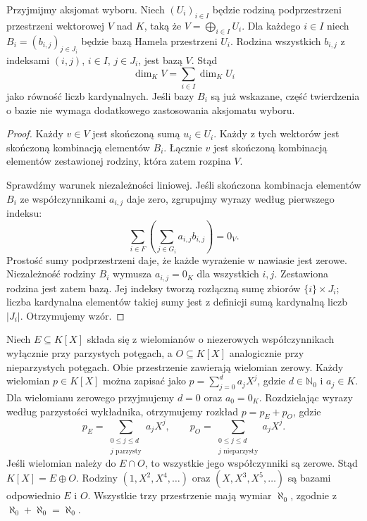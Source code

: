 \begin{twierdzenie}
\label{thm:lin2-wymiar-sumy-prostej}
Przyjmijmy aksjomat wyboru.
Niech \((U_i)_{i\in I}\) będzie rodziną
podprzestrzeni przestrzeni wektorowej \(V\) nad \(K\),
taką że \(V=\bigoplus_{i\in I}U_i\).
Dla każdego \(i\in I\) niech
\(B_i=(b_{i,j})_{j\in J_i}\)
będzie bazą Hamela przestrzeni \(U_i\).
Rodzina wszystkich \(b_{i,j}\)
z indeksami \((i,j)\), \(i\in I\), \(j\in J_i\),
jest bazą \(V\). Stąd
\[
 \dim_KV=\sum_{i\in I}\dim_KU_i
\]
jako równość liczb kardynalnych.
Jeśli bazy \(B_i\) są już wskazane,
część twierdzenia o bazie nie wymaga
dodatkowego zastosowania aksjomatu wyboru.
\end{twierdzenie}
\begin{proof}
Każdy \(v\in V\) jest skończoną sumą
\(u_i\in U_i\). Każdy z tych wektorów
jest skończoną kombinacją elementów \(B_i\).
Łącznie \(v\) jest skończoną kombinacją
elementów zestawionej rodziny,
która zatem rozpina \(V\).

Sprawdźmy warunek niezależności liniowej.
Jeśli skończona kombinacja elementów \(B_i\)
ze współczynnikami \(a_{i,j}\) daje zero,
zgrupujmy wyrazy według pierwszego indeksu:
\[
 \sum_{i\in F}
 \left(\sum_{j\in G_i}a_{i,j}b_{i,j}\right)=0_V.
\]
Prostość sumy podprzestrzeni daje,
że każde wyrażenie w nawiasie jest zerowe.
Niezależność rodziny \(B_i\) wymusza
\(a_{i,j}=0_K\) dla wszystkich \(i,j\).
Zestawiona rodzina jest zatem bazą.
Jej indeksy tworzą rozłączną sumę
zbiorów \(\{i\}\times J_i\);
liczba kardynalna elementów takiej sumy
jest z definicji sumą kardynalną liczb \(|J_i|\).
Otrzymujemy wzór.
\end{proof}

\begin{przyklad}
\label{prz:lin2-parzyste-nieparzyste}
Niech \(E\subseteq K[X]\) składa się
z wielomianów o niezerowych współczynnikach
wyłącznie przy parzystych potęgach,
a \(O\subseteq K[X]\) analogicznie
przy nieparzystych potęgach.
Obie przestrzenie zawierają wielomian zerowy.
Każdy wielomian \(p\in K[X]\) można zapisać
jako \(p=\sum_{j=0}^d a_jX^j\), gdzie
\(d\in\mathbb N_0\) i \(a_j\in K\).
Dla wielomianu zerowego przyjmujemy \(d=0\)
oraz \(a_0=0_K\).
Rozdzielając wyrazy według parzystości wykładnika,
otrzymujemy rozkład \(p=p_E+p_O\),
gdzie
\[
 p_E=\sum_{\substack{0\leq j\leq d\\j\text{ parzysty}}}a_jX^j,
 \qquad
 p_O=\sum_{\substack{0\leq j\leq d\\j\text{ nieparzysty}}}a_jX^j.
\]
Jeśli wielomian należy do \(E\cap O\),
to wszystkie jego współczynniki są zerowe.
Stąd \(K[X]=E\oplus O\).
Rodziny \((1,X^2,X^4,\ldots)\) oraz
\((X,X^3,X^5,\ldots)\) są bazami odpowiednio
\(E\) i \(O\). Wszystkie trzy przestrzenie
mają wymiar \(\aleph_0\), zgodnie
z \(\aleph_0+\aleph_0=\aleph_0\).
\end{przyklad}

